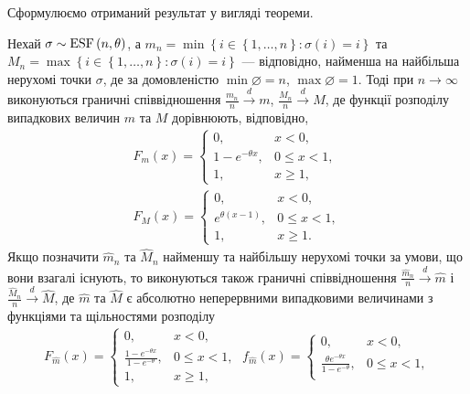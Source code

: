 Сформулюємо отриманий результат у вигляді теореми.
\begin{theorem}\label{th:min_max_limit}
    Нехай $\sigma \sim \mathrm{ESF}\left(n, \theta\right)$, а 
    $m_n = \min\left\{i\in \left\{1,\dots,n\right\}: \sigma(i) = i\right\}$
    та $M_n = \max\left\{i\in \left\{1,\dots,n\right\}: \sigma(i) = i\right\}$ --- відповідно,
    найменша на найбільша нерухомі точки $\sigma$, де за домовленістю
    $\min \varnothing = n$, $\max \varnothing = 1$. Тоді при $n\to\infty$ виконуються граничні
    співвідношення
    $\frac{m_n}{n} \overset{d}{\longrightarrow} m$, $\frac{M_n}{n} \overset{d}{\longrightarrow} M$,
    де функції розподілу випадкових величин $m$ та $M$ дорівнюють, відповідно,
    \begin{gather}
        F_m(x) = \begin{cases}
            0, & x < 0, \\
            1 - e^{-\theta x}, & 0 \leq x < 1, \\
            1, & x \geq 1,
        \end{cases} \\
        F_M(x) = \begin{cases}
            0, & x < 0, \\
            e^{\theta(x - 1)}, & 0 \leq x < 1, \\
            1, & x \geq 1.
        \end{cases}
    \end{gather}
    Якщо позначити $\widehat{m}_n$ та $\widehat{M}_n$ найменшу та найбільшу нерухомі точки
    за умови, що вони взагалі існують, то виконуються також граничні співвідношення
    $\frac{\widehat{m}_n}{n} \overset{d}{\longrightarrow} \widehat{m}$ і
    $\frac{\widehat{M}_n}{n} \overset{d}{\longrightarrow} \widehat{M}$, де
    $\widehat{m}$ та $\widehat{M}$ є абсолютно неперервними випадковими величинами
    з функціями та щільностями розподілу
    \begin{gather}
        F_{\widehat{m}}(x) = \begin{cases}
            0, & x < 0, \\
            \frac{1 - e^{-\theta x}}{1 - e^{-\theta}}, & 0 \leq x < 1, \\
            1, & x \geq 1,
        \end{cases}\;
        f_{\widehat{m}}(x) = \begin{cases}
            0, & x < 0, \\
            \frac{\theta e^{-\theta x}}{1 - e^{-\theta}}, & 0 \leq x < 1, \\

\end{cases}
\end{gather}
\end{theorem}
